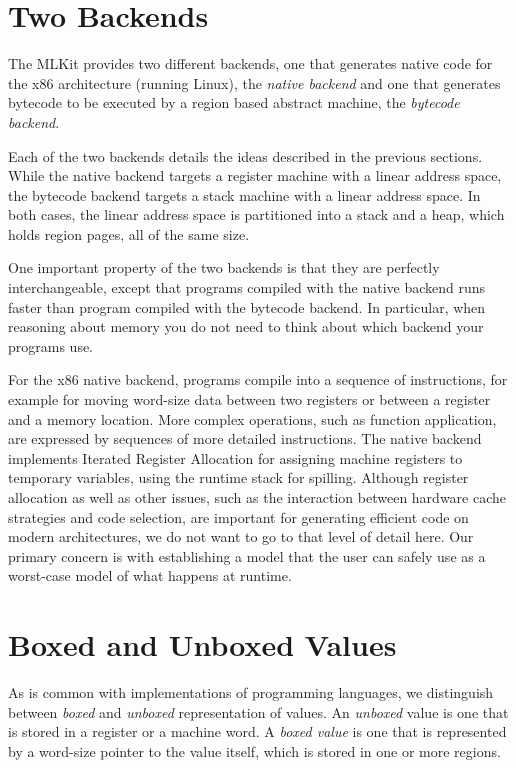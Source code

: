 \documentclass[12pt]{book}
\begin{document}

\section{Two Backends}
%
%
The MLKit provides two different backends, one that generates native
code for the x86 architecture (running Linux), the {\em native
  backend\/} and one that generates bytecode to be executed by a
region based abstract machine, the {\em bytecode backend}.

Each of the two backends details the ideas described in the previous
sections. While the native backend targets a register machine with a
linear address space, the bytecode backend targets a stack machine
with a linear address space. In both cases, the linear address space
is partitioned into a stack and a heap, which holds region pages, all
of the same size.

One important property of the two backends is that they are perfectly
interchangeable, except that programs compiled with the native backend
runs faster than program compiled with the bytecode backend. In
particular, when reasoning about memory you do not need to think about
which backend your programs use.

For the x86 native backend, programs compile into a sequence of
instructions, for example for moving word-size data between two
registers or between a register and a memory location.  More complex
operations, such as function application, are expressed by sequences
of more detailed instructions. The native backend implements Iterated
Register Allocation \cite{appel96} for assigning machine registers to
temporary variables, using the runtime stack for spilling.  Although
register allocation as well as other issues, such as the interaction
between hardware cache strategies and code selection, are important
for generating efficient code on modern architectures, we do not 
want to go to that level of detail here. Our primary concern is with
establishing a model that the user can safely use as a worst-case
model of what happens at runtime.

\section{Boxed and Unboxed Values}
\label{boxing.sec}
%
%
%
As is common with implementations of programming languages, we
distinguish between {\em boxed\/} and {\em unboxed\/} representation
of values.  An {\em unboxed\/} value is one that is stored in a
register or a machine word. A {\em boxed value\/} is one that is
represented by a word-size pointer to the value itself, which is
stored in one or more regions.
\end{document}
